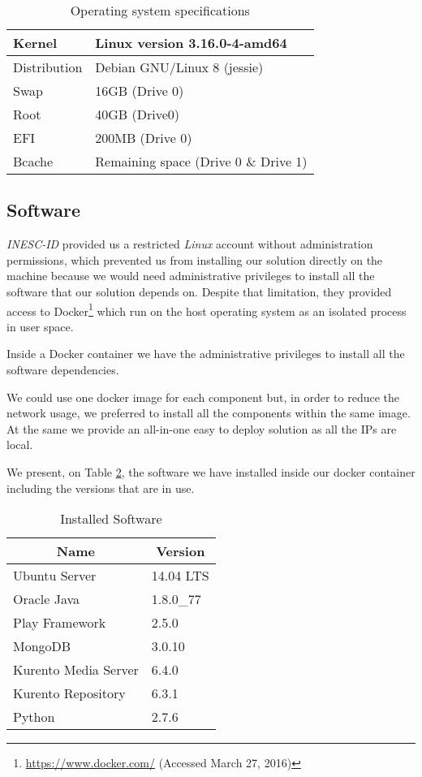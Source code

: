 	\begin{table}
\centering
\caption{Operating system specifications}
\label{table:osspecs}
\begin{tabular}{|l|l|}
\hline
Kernel & Linux version 3.16.0-4-amd64 \\ \hline
Distribution & Debian GNU/Linux 8 (jessie)\footnotemark \\ \hline
Swap & 16GB (Drive 0)\\ \hline
Root & 40GB (Drive0)\\ \hline
EFI & 200MB (Drive 0)\\ \hline
Bcache & Remaining space (Drive 0 \& Drive 1) \\ \hline
\end{tabular}
\end{table}


\subsection{Software}
	\emph{INESC-ID} provided us a restricted \emph{Linux} account without administration permissions, which prevented us from installing our solution directly on the machine because we would need administrative privileges to install all the software that our solution depends on. Despite that limitation, they provided access to Docker\footnote{\url{https://www.docker.com/} (Accessed March 27, 2016)} which run on the host operating system as an isolated process in user space.

	Inside a Docker container we have the administrative privileges to install all the software dependencies.

	We could use one docker image for each component but, in order to reduce the network usage, we preferred to install all the components within the same image. At the same we provide an all-in-one easy to deploy solution as all the \ac{IP}s are local.

	We present, on Table \ref{table:softspecs}, the software we have installed inside our docker container including the versions that are in use.

	\begin{table}
\centering
\caption{Installed Software}
\label{table:softspecs}
\begin{tabular}{|l|l|}
\hline
\multicolumn{1}{|c|}{\textbf{Name}} & \multicolumn{1}{c|}{\textbf{Version}}         \\ \hline
Ubuntu Server\footnotemark & 14.04 LTS   \\ \hline
Oracle Java & 1.8.0\_77   \\ \hline
Play Framework & 2.5.0  \\ \hline
MongoDB & 3.0.10   \\ \hline
Kurento Media Server & 6.4.0 \\ \hline
Kurento Repository & 6.3.1 \\ \hline
Python & 2.7.6 \\ \hline
\end{tabular}
\end{table}



